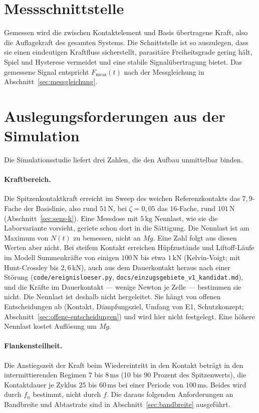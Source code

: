 \documentclass[12pt,a4paper]{report}
\begin{document}
\section{Messschnittstelle}

Gemessen wird die zwischen Kontaktelement und Basis übertragene Kraft,
also die Auflagekraft des gesamten Systems. Die Schnittstelle ist so
auszulegen, dass sie einen eindeutigen Kraftfluss sicherstellt,
parasitäre Freiheitsgrade gering hält, Spiel und Hysterese vermeidet und
eine stabile Signalübertragung bietet. Das gemessene Signal entspricht
$F_{\mathrm{meas}}(t)$ nach der Messgleichung in
Abschnitt~\ref{sec:messgleichung}.

\section{Auslegungsforderungen aus der Simulation}
\label{sec:auslegung-sim}

Die Simulationsstudie liefert drei Zahlen, die den Aufbau unmittelbar
binden.

\paragraph{Kraftbereich.}
Die Spitzenkontaktkraft erreicht im Sweep des weichen Referenzkontakts
das $7{,}9$-Fache der Basislinie, also rund $51\,\mathrm{N}$, bei
$\zeta = 0{,}05$ das $16$-Fache, rund $101\,\mathrm{N}$
(Abschnitt~\ref{sec:sens-k}). Eine Messdose mit $5\,\mathrm{kg}$
Nennlast, wie sie die Laborvariante vorsieht, geriete schon dort in die
Sättigung. Die Nennlast ist am Maximum von $N(t)$ zu bemessen, nicht an
$Mg$. Eine Zahl folgt aus diesen Werten aber nicht. Bei steifem Kontakt
erreichen Hüpfzustände und Liftoff-Läufe im Modell Summenkräfte von
einigen $100\,\mathrm{N}$ bis etwa $1\,\mathrm{kN}$ (Kelvin-Voigt; mit
Hunt-Crossley bis $2{,}6\,\mathrm{kN}$), auch aus dem
Dauerkontakt heraus nach einer Störung
(\texttt{code/ereignisloeser.py}, \texttt{docs/einzugsgebiete\_v1\_kandidat.md}),
und die Kräfte im Dauerkontakt --- wenige Newton je Zelle --- bestimmen
sie nicht. Die Nennlast ist deshalb nicht hergeleitet. Sie hängt von
offenen Entscheidungen ab (Kontakt, Dämpfungsziel, Umfang von E1,
Schutzkonzept; Abschnitt~\ref{sec:offene-entscheidungen}) und wird hier
nicht festgelegt. Eine höhere Nennlast kostet Auflösung um $Mg$.

\paragraph{Flankensteilheit.}
Die Anstiegszeit der Kraft beim Wiedereintritt in den Kontakt beträgt
in den intermittierenden Regimen $7$ bis $8\,\mathrm{ms}$ (10 bis
90 Prozent des Spitzenwerts), die Kontaktdauer je Zyklus $25$ bis
$60\,\mathrm{ms}$ bei einer Periode von $100\,\mathrm{ms}$. Beides wird
durch $f_n$ bestimmt, nicht durch $f$. Die daraus folgenden
Anforderungen an Bandbreite und Abtastrate sind in
Abschnitt~\ref{sec:bandbreite} ausgeführt.
\end{document}
